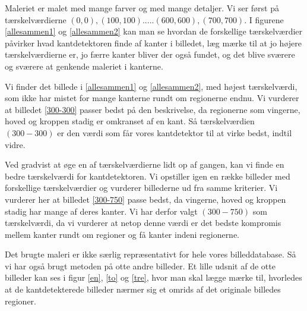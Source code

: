 Maleriet er malet med mange farver og med mange detaljer. Vi ser først
på tærskelværdierne $(0,0),(100,100).....(600,600),(700,700)$. I
figurene \ref{allesammen1} og \ref{allesammen2} kan man se hvordan de
forskellige tærskelværdier påvirker hvad kantdetektoren finde af kanter i
billedet, læg mærke til at jo højere tærskelværdierne er, jo færre kanter
bliver der også fundet, og det blive sværere og sværere at genkende maleriet i kanterne. 

Vi finder det billede i \ref{allesammen1} og \ref{allesammen2}, med
højest tærskelværdi, som ikke har mistet for mange kanterne rundt om
regionerne endnu. Vi vurderer at billedet \ref{300-300} passer bedst på
den beskrivelse, da regionerne som vingerne, hoved og kroppen stadig er
omkranset af en kant. Så tærskelværdien $(300-300)$ er den værdi som får
vores kantdetektor til at virke bedst, indtil vidre.

Ved gradvist at øge en af tærskelværdierne lidt op af gangen, kan vi finde en
bedre tærskelværdi for kantdetektoren. Vi opstiller igen en række
billeder med forskellige tærskelværdier og vurderer billederne ud fra
samme kriterier. Vi vurderer her at billedet \ref{300-750} passe bedst,
da vingerne, hoved og kroppen stadig har mange af deres kanter. Vi har
derfor valgt $(300-750)$ som tærskelværdi, da vi vurderer at netop denne
værdi er det bedste kompromis mellem kanter rundt om regioner og få
kanter indeni regionerne.

Det brugte maleri er ikke særlig repræsentativt for hele vores
billeddatabase. Så vi har også brugt metoden på otte andre billeder. Et
lille udsnit af de otte billeder kan ses i figur \ref{en}, \ref{to} og
\ref{tre}, hvor man skal lægge mærke til, hvorledes at de
kantdetekterede billeder nærmer sig et omrids af det originale billedes
regioner.

